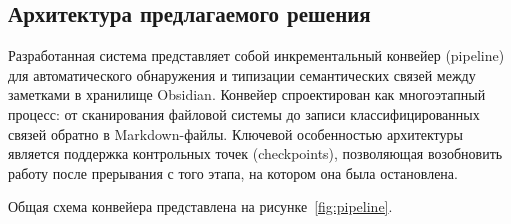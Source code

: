 \subsection{Архитектура предлагаемого решения}

Разработанная система представляет собой инкрементальный конвейер (pipeline) для автоматического обнаружения и типизации семантических связей между заметками в хранилище Obsidian.
Конвейер спроектирован как многоэтапный процесс: от сканирования файловой системы до записи классифицированных связей обратно в Markdown-файлы.
Ключевой особенностью архитектуры является поддержка контрольных точек (checkpoints), позволяющая возобновить работу после прерывания с того этапа, на котором она была остановлена.

Общая схема конвейера представлена на рисунке~\ref{fig:pipeline}.

